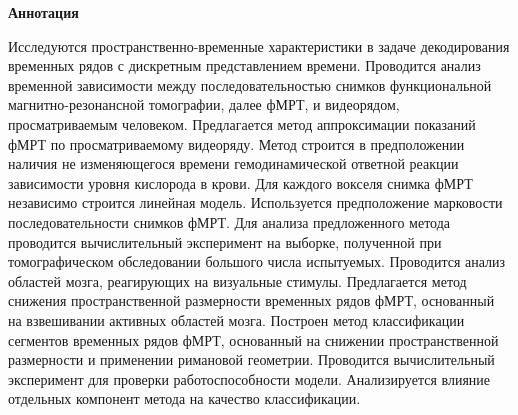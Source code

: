 \begin{center}
    \Large{\textbf{Аннотация}}
\end{center}

Исследуются пространственно-временные характеристики в задаче декодирования временных рядов с дискретным представлением времени. Проводится анализ временной зависимости между последовательностью снимков функциональной магнитно-резонансной томографии, далее фМРТ, и видеорядом, просматриваемым человеком. Предлагается метод аппроксимации показаний фМРТ по просматриваемому видеоряду.
Метод строится в предположении наличия не изменяющегося времени гемодинамической ответной реакции зависимости уровня кислорода в крови. Для каждого вокселя снимка фМРТ независимо строится линейная модель. Используется предположение марковости последовательности снимков фМРТ.
Для анализа предложенного метода проводится вычислительный эксперимент на выборке, полученной при томографическом обследовании большого числа испытуемых.
Проводится анализ областей мозга, реагирующих на визуальные стимулы.
Предлагается метод снижения пространственной размерности временных рядов фМРТ, основанный на взвешивании активных областей мозга.
Построен метод классификации сегментов временных рядов фМРТ, основанный на снижении пространственной размерности и применении римановой геометрии. Проводится вычислительный эксперимент для проверки работоспособности модели. Анализируется влияние отдельных компонент метода на качество классификации.